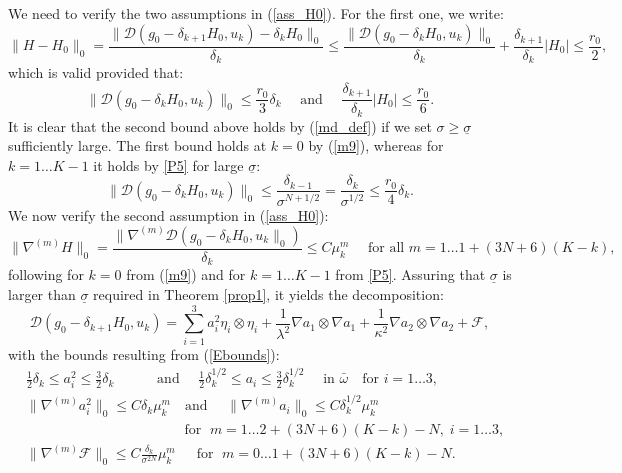 \documentclass[reqno,twoside,11pt]{amsart}
\numberwithin{equation}{section}
\theoremstyle{plain}
\theoremstyle{definition}
\begin{document}
\noindent We need to verify the two assumptions in (\ref{ass_H0}). For the first
one, we write:
$$\|H-H_0\|_0 = \frac{\|\mathcal{D}(g_0-\delta_{k+1}H_0,u_k) - \delta_kH_0\|_0}{\delta_k}
\leq \frac{\|\mathcal{D}(g_0-\delta_{k}H_0,u_k) \|_0}{\delta_k} +
\frac{\delta_{k+1}}{\delta_k}|H_0|\leq \frac{r_0}{2},$$
which is valid provided that:
\begin{equation*}
\|\mathcal{D}(g_0-\delta_{k}H_0,u_k) \|_0\leq \frac{r_0}{3}\delta_k
\quad\mbox{ and }\quad \frac{\delta_{k+1}}{\delta_k}|H_0|\leq \frac{r_0}{6}.
\end{equation*}
It is clear that the second bound above holds by 
(\ref{md_def}) if we set $\sigma\geq \underline\sigma$ 
sufficiently large. The first bound holds at $k=0$ by (\ref{m9}), whereas for
$k=1\ldots K-1$ it holds by \ref{P5} for large $\underline\sigma$:
$$\|\mathcal{D}(g_0-\delta_k H_0, u_k)\|_0\leq
\frac{\delta_{k-1}}{\sigma^{N+1/2}} = \frac{\delta_k}{\sigma^{1/2}}\leq \frac{r_0}{4}\delta_k.$$
We now verify the second assumption in (\ref{ass_H0}):
$$\|\nabla^{(m)}H\|_0= \frac{\|\nabla^{(m)}\mathcal{D}(g_0-\delta_{k}H_0,u_k\|_0)}{\delta_k}
\leq C\mu_k^m \quad\mbox{ for all } m=1\ldots 1+(3N+6)(K-k),$$
following for $k=0$ from (\ref{m9}) and for $k=1\ldots K-1$ from \ref{P5}.
Assuring that $\underline\sigma$ is larger than $\underline\sigma$
required in Theorem \ref{prop1}, it yields the decomposition:
\begin{equation}\label{m10}
\mathcal{D}(g_0-\delta_{k+1}H_0,u_k) =
\sum_{i=1}^3a_i^2\eta_i\otimes\eta_i + \frac{1}{\lambda^2}\nabla a_1\otimes\nabla a_1
+ \frac{1}{\kappa^2}\nabla a_2\otimes\nabla a_2 + \mathcal{F},
\end{equation}
with the bounds resulting from (\ref{Ebounds}):
\begin{equation}\label{Ebounds2}
\begin{split}
&  \frac{1}{2}\delta_k\leq a_i^2\leq \frac{3}{2}\delta_k \; \; \quad
\quad \, \mbox{ and }\quad 
\frac{1}{2}\delta_k^{1/2}\leq a_i\leq \frac{3}{2} \delta_k^{1/2}\quad\mbox{ in }\bar\omega \quad \mbox{
for } i=1\ldots 3,\\
& \|\nabla^{(m)} a_i^2\|_0\leq C\delta_k\mu_k^m\quad 
\mbox{and } \quad \|\nabla^{(m)} a_i\|_0\leq C\delta_k^{1/2}\mu_k^m \\
&\qquad\qquad\qquad\qquad \qquad\quad \mbox{ for }\;
 m=1\ldots 2+(3N+6)(K-k)-N,\;  i=1\ldots 3,\\
& \|\nabla^{(m)}\mathcal{F}\|_0\leq
C\frac{\delta_k}{\sigma^{2N}}\mu_k^m\quad\,\mbox{ for } \; m=0\ldots 1+(3N+6)(K-k)-N.
\end{split}
\end{equation}
\end{document}
